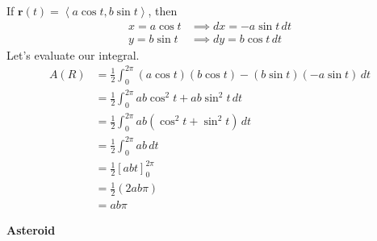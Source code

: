 \documentclass{article}
\newcommand{\lrp}[1]{\left( #1 \right)}
\newcommand{\lra}[1]{\left\langle #1 \right\rangle}
\newcommand{\lrb}[1]{\left[ #1 \right]}
\renewcommand{\r}[0]{\mathbf{r}}
\begin{document}
If $\r(t)=\lra{a\cos t,b\sin t}$, then
\begin{align*}
    x=a\cos t&\implies dx=-a\sin t\,dt\\
    y=b\sin t&\implies dy =b\cos t\,dt
\end{align*}
Let's evaluate our integral.
\begin{align*}
    A(R)&=\frac{1}{2}\int_0^{2\pi} \lrp{a\cos t}\lrp{b\cos t}-\lrp{b\sin t}\lrp{-a\sin t}\,dt\tag{$0\leq t\leq 2\pi$ given}\\
    &=\frac{1}{2}\int_0^{2\pi} ab\cos^2t + ab\sin^2 t\,dt\\
    &=\frac{1}{2}\int_0^{2\pi} ab\lrp{\cos^2 t+\sin^2 t}\,dt\\
    &=\frac{1}{2}\int_0^{2\pi} ab\,dt\tag{$\cos^2 t+\sin^2 t =1$}\\
    &=\frac{1}{2}\lrb{abt}_0^{2\pi}\\
    &=\frac{1}{2}\lrp{2ab\pi}\\
    &=ab\pi
\end{align*}

{} \textbf{Asteroid}
\end{document}
